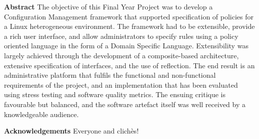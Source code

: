 \documentclass[10pt,a4paper,notitlepage,svgnames]{report}
\begin{document}
	\vspace*{\fill}
	
	\thispagestyle{empty}
	\pagestyle{empty}

\newpage

	\vspace*{\fill}
	
	\huge\textbf{Abstract\newline}
	\newline
	\normalsize
	{
		The objective of this Final Year Project was to develop a Configuration Management framework that supported specification of policies for a Linux 
		heterogeneous environment. The framework had to be extensible, provide a rich user interface, and allow administrators to specify rules using a policy 
		oriented language in the form of a Domain Specific Language. Extensibility was largely achieved through the development of a composite-based architecture, 
		extensive specification of interfaces, and the use of reflection. The end result is an administrative platform that fulfils the functional 
		and non-functional requirements of the project, and an implementation that has been evaluated using stress testing and software quality metrics. 
		The ensuing critique is favourable but balanced, and the software artefact itself was well received by a knowledgeable audience.
		\newline
		\newline
	}
	
	\huge\textbf{Acknowledgements\newline}
	\newline
	\normalsize
	{		
		Everyone and clich\`es!
	}
	
	\vspace*{\fill}
	
	
	\thispagestyle{empty}
	\pagestyle{empty}

\newpage


\cleardoublepage
{}
\tableofcontents
\cleardoublepage

\newpage
{}
\normalsize{\listoffigures}
\begingroup
\let\clearpage\relax
\vspace{5mm}
\normalsize{\listoftables}
\endgroup
\cleardoublepage
\end{document}
